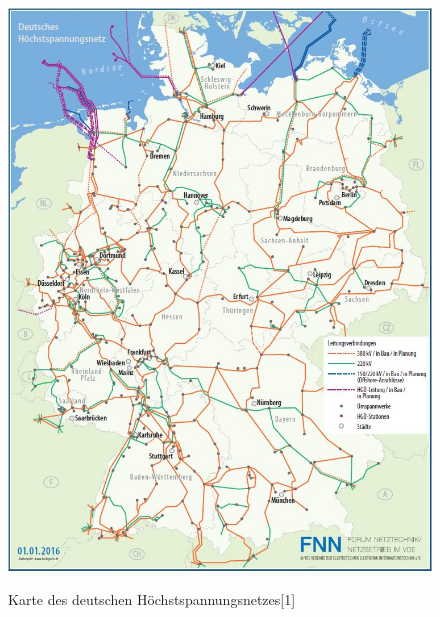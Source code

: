 \begin{figure}[t]
	\centering
	{\includegraphics[scale=0.5]{bilder/hochstspannungsnetz}\label{fig_hochstspannungsnetz}
	}\\
	\caption[Karte des deutschen Höchstspannungsnetzes]{Karte des deutschen Höchstspannungsnetzes[1]}
	\label{fig_hochstspannungsnetz2}
\end{figure}
